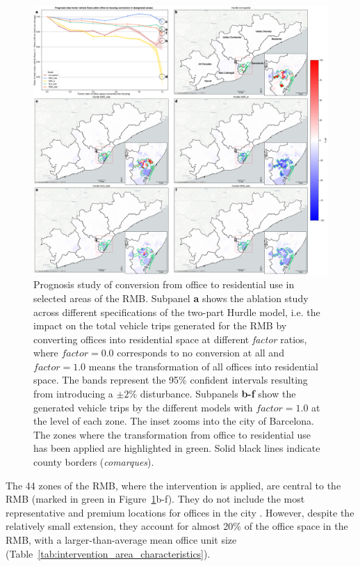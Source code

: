 \begin{figure}[h!]
    \centering
    \includegraphics[width=1\textwidth]{fig_prognosis_combined_v1 copy.png}
    \caption{Prognosis study of conversion from office to residential use in selected areas of the RMB. Subpanel \textbf{a} shows the ablation study across different specifications of the two-part Hurdle model, i.e. the impact on the total vehicle trips generated for the RMB by converting offices into residential space at different \emph{factor} ratios, where $\mathit{factor}=0.0$ corresponds to no conversion at all and $\mathit{factor}=1.0$ means the transformation of all offices into residential space. The bands represent the 95\% confident intervals resulting from introducing a $\pm2\%$ disturbance. Subpanels \textbf{b-f} show the generated vehicle trips by the different models with $\mathit{factor}=1.0$ at the level of each zone. The inset zooms into the city of Barcelona. The zones where the transformation from office to residential use has been applied are highlighted in green. Solid black lines indicate county borders (\textit{comarques}).}
    \label{fig:prognosis_summary}
\end{figure}

The 44 zones of the RMB, where the intervention is applied, are central to the RMB (marked in green in Figure~\ref{fig:prognosis_summary}b-f). They do not include the most representative and premium locations for offices in the city \citep{2023The2023}. However, despite the relatively small extension, they account for almost 20\% of the office space in the RMB, with a larger-than-average mean office unit size (Table~\ref{tab:intervention_area_characteristics}).


